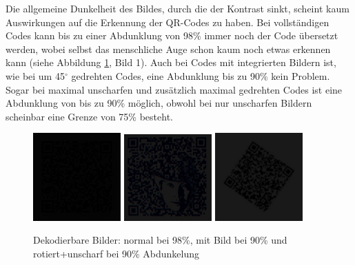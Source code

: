 Die allgemeine Dunkelheit des Bildes, durch die der Kontrast sinkt, scheint kaum Auswirkungen auf die Erkennung der QR-Codes zu haben. Bei vollständigen Codes kann bis zu einer Abdunklung von 98\% immer noch der Code übersetzt werden, wobei selbst das menschliche Auge schon kaum noch etwas erkennen kann (siehe Abbildung \ref*{fig:qrdark}, Bild 1). Auch bei Codes mit integrierten Bildern ist, wie bei um 45$ ^\circ $ gedrehten Codes, eine Abdunklung bis zu 90\% kein Problem. Sogar bei maximal unscharfen und zusätzlich maximal gedrehten Codes ist eine Abdunklung von bis zu 90\% möglich, obwohl bei nur unscharfen Bildern scheinbar eine Grenze von 75\% besteht.
\begin{figure}[H]
  \centering
  \includegraphics[width=0.3\textwidth]{img/QR/dark_03_98.jpg}
  \includegraphics[width=0.3\textwidth]{img/QR/dark_04_90.jpg}
  \includegraphics[width=0.3\textwidth]{img/QR/blurrydarkrotate_03_3_90_35.jpg}
  \caption{Dekodierbare Bilder: normal bei 98\%, mit Bild bei 90\% und rotiert+unscharf bei 90\% Abdunkelung}
  \label{fig:qrdark}
\end{figure}


